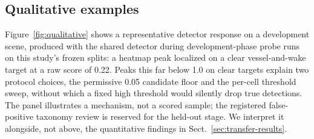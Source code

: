 

\subsection{Qualitative examples}
\label{sec:qualitative-errors}



Figure~\ref{fig:qualitative} shows a representative detector response on a
development scene, produced with the shared detector during
development-phase probe runs on this study's frozen splits: a heatmap peak
localized on a clear vessel-and-wake target at a raw score of 0.22. Peaks
this far below 1.0 on clear targets explain two protocol choices, the
permissive 0.05 candidate floor and the per-cell threshold sweep, without
which a fixed high threshold would silently drop true detections. The panel
illustrates a mechanism, not a scored sample; the registered false-positive
taxonomy review is reserved for the held-out stage. We interpret it
alongside, not above, the quantitative findings in
Sect.~\ref{sec:transfer-results}.
